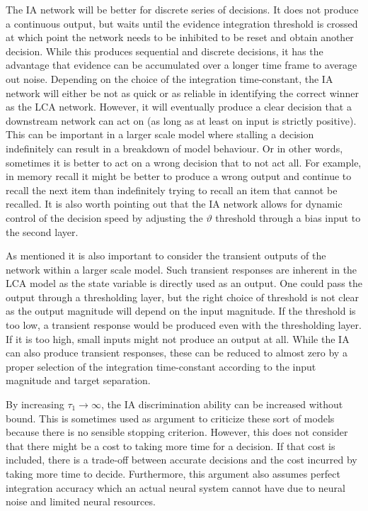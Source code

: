 The IA network will be better for discrete series of decisions.
It does not produce a continuous output, but waits until the evidence integration threshold is crossed at which point the network needs to be inhibited to be reset and obtain another decision.
While this produces sequential and discrete decisions, it has the advantage that evidence can be accumulated over a longer time frame to average out noise.
Depending on the choice of the integration time-constant, the IA network will either be not as quick or as reliable in identifying the correct winner as the LCA network.
However, it will eventually produce a clear decision that a downstream network can act on (as long as at least on input is strictly positive).
This can be important in a larger scale model where stalling a decision indefinitely can result in a breakdown of model behaviour.
Or in other words, sometimes it is better to act on a wrong decision that to not act all.
For example, in memory recall it might be better to produce a wrong output and continue to recall the next item than indefinitely trying to recall an item that cannot be recalled.
It is also worth pointing out that the IA network allows for dynamic control of the decision speed by adjusting the $\vartheta$ threshold through a bias input to the second layer.

As mentioned it is also important to consider the transient outputs of the network within a larger scale model.
Such transient responses are inherent in the LCA model as the state variable is directly used as an output.
One could pass the output through a thresholding layer, but the right choice of threshold is not clear as the output magnitude will depend on the input magnitude.
If the threshold is too low, a transient response would be produced even with the thresholding layer.
If it is too high, small inputs might not produce an output at all.
While the IA can also produce transient responses, these can be reduced to almost zero by a proper selection of the integration time-constant according to the input magnitude and target separation.

By increasing $\tau_1 \rightarrow \infty$, the IA discrimination ability can be increased without bound.
This is sometimes used as argument to criticize these sort of models \parencite[e.g.,][]{Usher2001} because there is no sensible stopping criterion.
However, this does not consider that there might be a cost to taking more time for a decision.
If that cost is included, there is a trade-off between accurate decisions and the cost incurred by taking more time to decide.
Furthermore, this argument also assumes perfect integration accuracy which an actual neural system cannot have due to neural noise and limited neural resources.

